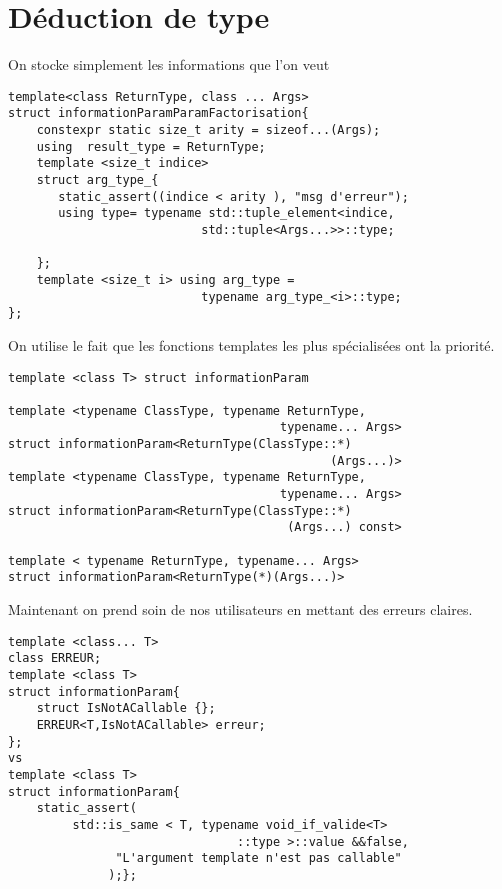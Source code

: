 \documentclass{beamer}
\begin{document}
\section{Déduction de type}
\begin{frame}[containsverbatim]
On stocke simplement les informations que l'on veut
\begin{lstlisting}
template<class ReturnType, class ... Args>
struct informationParamParamFactorisation{
    constexpr static size_t arity = sizeof...(Args);
    using  result_type = ReturnType;
    template <size_t indice>
    struct arg_type_{
       static_assert((indice < arity ), "msg d'erreur");
       using type= typename std::tuple_element<indice,
                           std::tuple<Args...>>::type;

    };
    template <size_t i> using arg_type = 
                           typename arg_type_<i>::type;
};
\end{lstlisting}
\end{frame}
\begin{frame}[containsverbatim]
On utilise le fait que les fonctions templates les plus spécialisées ont la priorité.
\begin{lstlisting}
template <class T> struct informationParam 

template <typename ClassType, typename ReturnType,
                                      typename... Args>
struct informationParam<ReturnType(ClassType::*)
                                             (Args...)>
template <typename ClassType, typename ReturnType,
                                      typename... Args>
struct informationParam<ReturnType(ClassType::*)
                                       (Args...) const>

template < typename ReturnType, typename... Args>
struct informationParam<ReturnType(*)(Args...)>
\end{lstlisting}

\end{frame} 


 

\begin{frame}[containsverbatim]
Maintenant on prend soin de nos utilisateurs en mettant des erreurs claires. 
\begin{lstlisting}
template <class... T>
class ERREUR;
template <class T>
struct informationParam{
    struct IsNotACallable {};
    ERREUR<T,IsNotACallable> erreur;
};
vs
template <class T>
struct informationParam{
    static_assert(
         std::is_same < T, typename void_if_valide<T>
                                ::type >::value &&false,
               "L'argument template n'est pas callable"
              );};

\end{lstlisting}
\end{frame}
\end{document}
